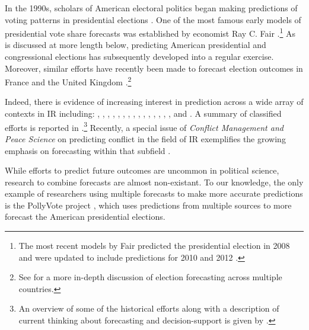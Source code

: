 \documentclass[pdftex,12pt,fullpage,oneside]{amsart}
\begin{document}
In the 1990s, scholars of American electoral politics began making
predictions of voting patterns in presidential elections
\citep{Campbell:1990, Campbell:1992}. One of the most famous early
models of presidential vote share forecasts was established by
economist Ray C. Fair \citet{Fair:1978}.\footnote{The most recent
  models by Fair predicted the presidential election in 2008
  \citet{Fair:2009} and were updated to include predictions for 2010
  and 2012 \citet{Fair:2010}.} As is discussed at more length below,
predicting American presidential and congressional elections has
subsequently developed into a regular exercise.  Moreover, similar
efforts have recently been made to forecast election outcomes in France
\citep[e.g.,][]{Jerome:1999} and the United Kingdom
\citep[e.g.,][]{Whitely:2005}.\footnote{See \citet{Lewis-Beck:2005}
  for a more in-depth discussion of election forecasting across
  multiple countries.}

Indeed, there is evidence of increasing interest in prediction across a
wide array of contexts in IR including:
\citet{Krause:1997}, \citet{Davies:Gurr:1998},
\citet{Pevehouse:Goldstein:1999}, \citet{Schrodt:Gerner:2000},
\citet{King:Zeng:2001}, \citet{OBrien:2002}, \citet{BDM:2002},
\citet{Fearon:Laitin:2003}, \citet{Demarchi:etal:2004},
\citet{Ruger:2004}, \citet{Enders:Sandler:2005},
\citet{Leblang:Satyanath:2006}, \citet{Ward:etal:2007},
\citet{Brandt:etal:2008}, \citet{Bennett:Stam:2009}, and
\citet{Gleditsch:Ward:2010}. A summary of classified efforts is
reported in \citet{Feder:2002}.\footnote{An overview of some of the
  historical efforts along with a description of current thinking
  about forecasting and decision-support is given by
  \citet{OBrien:2010}.}  Recently, a special issue of \emph{Conflict
  Management and Peace Science} on predicting conflict in the field of
IR exemplifies the growing emphasis on forecasting within that
subfield \citep[c.f.,][]{Schneider_etal_2011, Mesquita_2011,
  Brandt_etal_2011}.

While efforts to predict future outcomes are uncommon in political
science, research to combine forecasts are almost non-existant.  To
our knowledge, the only example of researchers using multiple
forecasts to make more accurate predictions is the PollyVote project
\citep[c.f.][]{Graefe:2010}, which uses predictions from multiple
sources to more forecast the American presidential elections.
\end{document}
